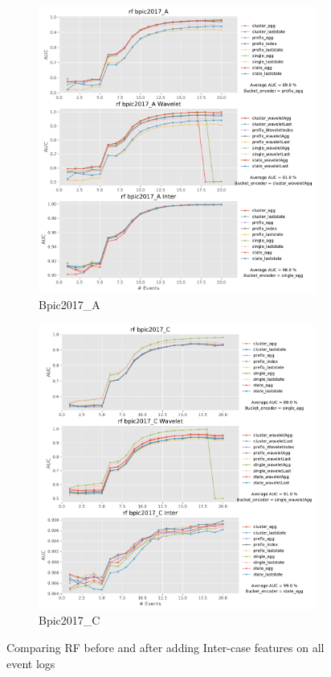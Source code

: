 \begin{figure}[!htbp]
	\begin{subfigure}{0.48\textwidth}
		\includegraphics[width=\linewidth]{images/inter/rf/bpic2017_A.pdf}
		\caption{Bpic2017\_A} \label{fig:b17ai}
	\end{subfigure}\hspace*{\fill}
	\begin{subfigure}{0.48\textwidth}
		\includegraphics[width=\linewidth]{images/inter/rf/bpic2017_C.pdf}
		\caption{Bpic2017\_C} \label{fig:b17ci}
	\end{subfigure}
		\caption{Comparing RF before and after adding Inter-case features on all event logs}
	\label{fig:interr1}
\end{figure}


